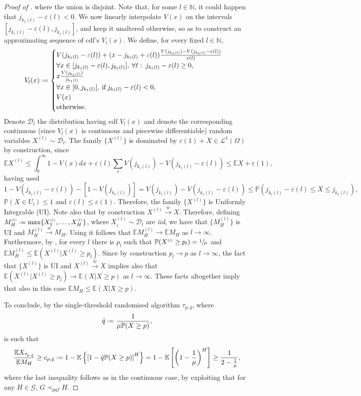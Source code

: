 \documentclass[11pt, a4paper, twoside]{article}
\newcommand*{\defeq}{\mathrel{\vcenter{\baselineskip0.5ex \lineskiplimit0pt
			\hbox{\scriptsize.}\hbox{\scriptsize.}}}=}
\newcommand{\ssup}[1]{{\scriptscriptstyle{({#1})}}}
\newcommand{\eps}{\varepsilon}
\newcommand{\NN}{\mathbb{N}}
\newcommand{\EE}{\mathbb{E}}
\newcommand{\PP}{\mathbb{P}}
\newcommand{\DD}{\mathcal{D}}
\newcommand{\PGF}{\mathcal{G}}
\numberwithin{equation}{section}
\begin{document}
\begin{proof}[Proof of ]
		where the union is disjoint. Note that, for some $l\in\NN$, it could happen that $j_{k_{1}(l)}-\eps(l)<0$. We now linearly interpolate $V(x)$ on the intervals $[j_{k_{\ell}(l)}-\eps(l),j_{k_{\ell}(l)}]$, and keep it unaltered otherwise, so as to construct an approximating sequence of cdf's $V_l(x)$. We define, for every fixed $l\in\NN$,
		\[V_l(x)\defeq\begin{cases}
			V(j_{k_{\ell}(l)}-\eps(l))+(x-j_{k_{\ell}(l)}+\eps(l))\frac{V(j_{k_{\ell}(l)})-V(j_{k_{\ell}(l)}-\eps(l))}{\eps(l)}\\\forall x\in[j_{k_{\ell}(l)}-\eps(l),j_{k_{\ell}(l)}],\:\forall\ell:\: j_{k_{\ell}(l)}-\eps(l)\ge0,\\
			x\frac{V(j_{k_{1}(l)})}{j_{k_{1}(l)}}\\\forall x\in[0,j_{k_{1}(l)}],\: \text{if}\: j_{k_{1}(l)}-\eps(l)<0,\\
			V(x)\\\text{otherwise}.
		\end{cases}\]
		Denote $\DD_l$ the distribution having cdf $V_l(x)$ and denote the corresponding continuous (since $V_l(x)$ is continuous and piecewise differentiable) random variables $X^\ssup{l}\sim\DD_l$. The family $\{X^\ssup{l}\}$ is dominated by $\eps(1)+X\in\mathcal{L}^1(\Omega)$ by construction, since 
		\[\EE X^\ssup{l}\le\int_0^\infty1-V(x)dx+\eps(l)\sum_{\ell}V(j_{k_\ell(l)})-V(j_{k_\ell(l)}-\eps(l))\le \EE X +\eps(1),\]
		having used \[1-V(j_{k_\ell(l)}-\eps(l))-[1-V(j_{k_\ell(l)})]=V(j_{k_\ell(l)})-V(j_{k_\ell(l)}-\eps(l))\le\PP(j_{k_\ell(l)}-\eps(l)\le X\le j_{k_\ell(l)}),\] $\PP(X\in U_l)\le 1$ and $\eps(l)\le\eps(1)$.
		Therefore, the family $\{X^\ssup{l}\}$ is Uniformly Integrable (UI). Note also that by construction $X^\ssup{l}\overset{w}{\longrightarrow}X$. Therefore, defining $M_H^\ssup{l}\defeq \max\{X_1^\ssup{l},\ldots,X_H^\ssup{l}\}$, where $X_i^\ssup{l}\sim \DD_l$ are \textit{iid}, we have that $\{M_H^\ssup{l}\}$ is UI and $M_H^\ssup{l}\overset{w}{\longrightarrow}M_H$. Using \cite[Corollary~5]{Bill87} it follows that $\EE M_H^\ssup{l}\longrightarrow\EE M_H$ as $l\longrightarrow\infty$. Furthermore, by , for every $l$ there is $p_l$ such that $\PP(X^\ssup{l}\ge p_l)=\sfrac{1}{\mu}$ and $\EE M_H^\ssup{l}\le\EE(X^\ssup{l}|X^\ssup{l}\ge p_l)$. Since by construction $p_l\longrightarrow p$ as $l\longrightarrow\infty$, the fact that $\{X^\ssup{l}\}$ is UI and $X^\ssup{l}\overset{w}{\longrightarrow}X$ implies also that $\EE(X^\ssup{l}|X^\ssup{l}\ge p_l)\longrightarrow \EE(X|X\ge p)$ as $l\longrightarrow\infty$. These facts altogether imply that also in this case $\EE M_H\le \EE(X|X\ge p)$.
		
		To conclude, by  the single-threshold randomised algorithm $\tau_{p,\bar{q}}$, where \[\bar{q}\defeq\frac{1}{\mu\PP(X\ge p)},\]
		is such that 
		\[\frac{\EE X_{\tau_{p,\bar{q}}}}{\EE M_H}\ge c_{p,\bar{q}}\defeq1-\EE\left\lbrace\left[1-\bar{q}\PP(X\ge p)\right]^H\right\rbrace=1-\EE\left[\left(1-\frac{1}{\mu}\right)^H\right]\ge\frac{1}{2-\frac{1}{\mu}},\]
		where the last inequality follows as in the continuous case, by exploiting that for any $H\in\PGF$, $G\prec_{pgf}H$.
	\end{proof}
	
\end{document}
